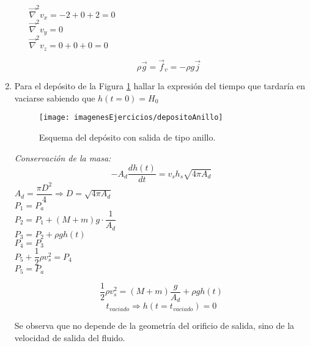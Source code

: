 \begin{enumerate}
\begin{enumerate}
		$\vec{\nabla}^2 v_x = -2 + 0 + 2 = 0$\\
		$\vec{\nabla}^2 v_y = 0$\\
		$\vec{\nabla}^2 v_z = 0 + 0 + 0 = 0$
		
		\[\rho \vec{g} = \vec{f}_v = -\rho g \vec{j}\]
		
\end{enumerate}

\newpage
\black
\item Para el depósito de la Figura \ref{fig:depositoAnillo} hallar la expresión del tiempo que tardaría en vaciarse sabiendo que $h(t = 0) = H_0$

\begin{figure}[H]
	\centering
	\texttt{[image: imagenesEjercicios/depositoAnillo]}
	\caption{Esquema del depósito con salida de tipo anillo.}
	\label{fig:depositoAnillo}
\end{figure}

\blue
	\textit{Conservación de la masa:}
		\[-A_d \dfrac{dh(t)}{dt} = v_s h_s \sqrt{4\pi A_d}\]
		$A_d = \dfrac{\pi D^2}{4} \Rightarrow D = \sqrt{4\pi A_d}$\\
		$P_1 = P_a$\\
		$P_2 = P_1 + (M + m)g \cdot \dfrac{1}{A_d}$\\
		$P_3 = P_2 + \rho g h(t)$\\
		$P_4 = P_3$\\
		$P_5 + \dfrac{1}{2}\rho v_s^2 = P_4$\\
		$P_5 = P_a$
		
		\[\dfrac{1}{2}\rho v_s^2 = (M + m)\dfrac{g}{A_d} + \rho g h(t)\]
		\[t_{vaciado} \Rightarrow h(t = t_{vaciado}) = 0\]
		
	Se observa que no depende de la geometría del orificio de salida, sino de la velocidad de salida del fluido.

\end{enumerate}